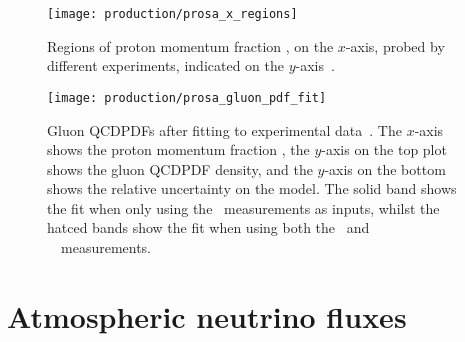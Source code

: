 %   

\begin{figure}
  \centering
  \texttt{[image: production/prosa\_x\_regions]}
  \caption{%
    Regions of proton momentum fraction \bjorkenx, on the $x$-axis, probed by 
    different experiments, indicated on the $y$-axis~\cite{Zenaiev:2015rfa}.
  }
  \label{fig:prod:theory:prosa_x_regions}
\end{figure}

\begin{figure}
  \centering
  \texttt{[image: production/prosa\_gluon\_pdf\_fit]}
  \caption{%
    Gluon \acp{QCDPDF} after fitting to experimental 
    data~\cite{Zenaiev:2015rfa}.
    The $x$-axis shows the proton momentum fraction \bjorkenx, the $y$-axis on 
    the top plot shows the gluon \ac{QCDPDF} density, and the $y$-axis on the 
    bottom shows the relative uncertainty on the model.
    The solid band shows the fit when only using the \hera\ measurements as 
    inputs, whilst the hatced bands show the fit when using both the \hera\ and 
    \ \lhcb\ measurements.
  }
  \label{fig:prod:theory:prosa_gluon_pdf_fit}
\end{figure}

\section{Atmospheric neutrino fluxes}
\label{chap:prod:theory:neutrinos}


